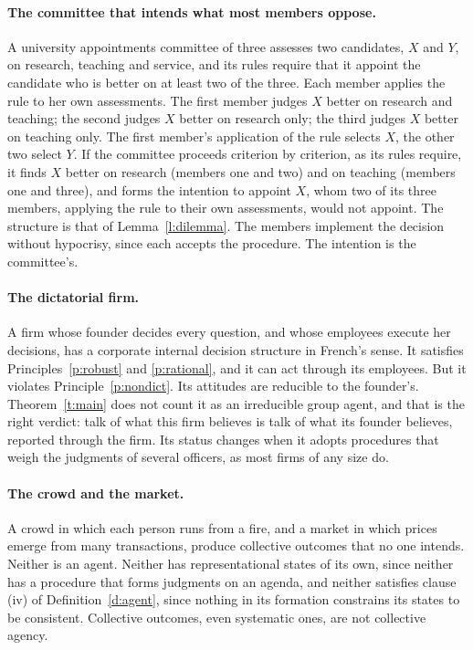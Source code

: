 \documentclass{situationist-preprint}
\begin{document}
\paragraph{The committee that intends what most members oppose.} A university appointments committee of three assesses two candidates, $X$ and $Y$, on research, teaching and service, and its rules require that it appoint the candidate who is better on at least two of the three. Each member applies the rule to her own assessments. The first member judges $X$ better on research and teaching; the second judges $X$ better on research only; the third judges $X$ better on teaching only. The first member's application of the rule selects $X$, the other two select $Y$. If the committee proceeds criterion by criterion, as its rules require, it finds $X$ better on research (members one and two) and on teaching (members one and three), and forms the intention to appoint $X$, whom two of its three members, applying the rule to their own assessments, would not appoint. The structure is that of Lemma~\ref{l:dilemma}. The members implement the decision without hypocrisy, since each accepts the procedure. The intention is the committee's.

\paragraph{The dictatorial firm.} A firm whose founder decides every question, and whose employees execute her decisions, has a corporate internal decision structure in French's sense. It satisfies Principles~\ref{p:robust} and \ref{p:rational}, and it can act through its employees. But it violates Principle~\ref{p:nondict}. Its attitudes are reducible to the founder's. Theorem~\ref{t:main} does not count it as an irreducible group agent, and that is the right verdict: talk of what this firm believes is talk of what its founder believes, reported through the firm. Its status changes when it adopts procedures that weigh the judgments of several officers, as most firms of any size do.

\paragraph{The crowd and the market.} A crowd in which each person runs from a fire, and a market in which prices emerge from many transactions, produce collective outcomes that no one intends. Neither is an agent. Neither has representational states of its own, since neither has a procedure that forms judgments on an agenda, and neither satisfies clause (iv) of Definition~\ref{d:agent}, since nothing in its formation constrains its states to be consistent. Collective outcomes, even systematic ones, are not collective agency.
\end{document}
